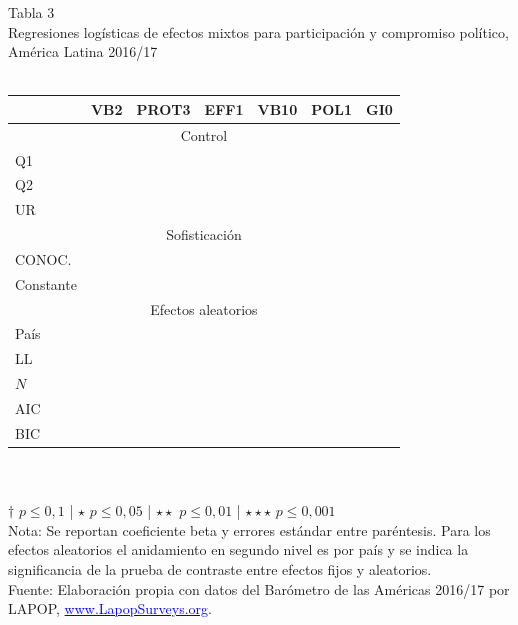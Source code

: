 \documentclass[a4paper]{tufte-handout}
\begin{document}
\begin{table}[h]
  \centering
  \selectfont
   \smallskip\noindent\small Tabla 3 \\ Regresiones logísticas de efectos mixtos para participación y compromiso político, América Latina 2016/17 \\~\\
  \begin{tabular}{l c c c c c c}
    \toprule
     & VB2 & PROT3 & EFF1 & VB10 & POL1 & GI0 \\ \midrule
    \multicolumn{7}{c}{Control} \\ \midrule
    \multirow{2}{*}{Q1} & & & & & \\
    & & & & & & \\ 
    \multirow{2}{*}{Q2} & & & & & & \\
    & & & & & & \\
    \multirow{2}{*}{UR} & & & & & & \\
    & & & & & & \\ \midrule
    \multicolumn{7}{c}{Sofisticación} \\ \midrule
    \multirow{2}{*}{CONOC.} & & & & & & \\
    & & & & & & \\ \midrule
    \multirow{2}{*}{Constante} & & & & & & \\
    & & & & & & \\ \midrule
    \multicolumn{7}{c}{Efectos aleatorios} \\ \midrule    
    \multirow{2}{*}{País} & & & & & & \\
    & & & & & & \\ \midrule
    LL & & & & & & \\ \midrule
    $N$ & & & & & & \\ \midrule
    AIC & & & & & & \\
    BIC & & & & & & \\ \bottomrule
  \end{tabular}
  \\~\\ \smallskip\noindent\scriptsize $\dagger$ $p \leq 0,1$ | $\star$ $p \leq 0,05$ | $\star\star$ $p \leq 0,01$ | $\star\star\star$ $p \leq 0,001$  \\ Nota: Se reportan coeficiente beta y errores estándar entre paréntesis. Para los efectos aleatorios el anidamiento en segundo nivel es por país y se indica la significancia de la prueba de contraste entre efectos fijos y aleatorios.\\ Fuente: Elaboración propia con datos del Barómetro de las Américas 2016/17 por LAPOP, \href{https://www.vanderbilt.edu/lapop/}{\textcolor{blue}{www.LapopSurveys.org}}.
\end{table}
\end{document}
